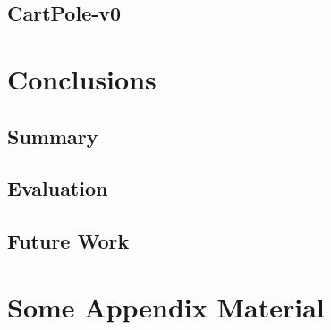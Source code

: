 \documentclass[11pt, a4paper, bibliography=totoc]{report}
\begin{document}
\section{CartPole-v0}


\chapter{Conclusions}
\section{Summary}
\section{Evaluation}
\section{Future Work}





\appendix
\appendixpage
\noappendicestocpagenum
\addappheadtotoc
\chapter{Some Appendix Material}
\end{document}
